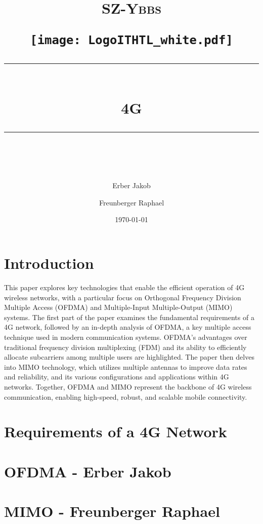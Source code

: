 \documentclass[11pt]{scrartcl} %
\title{	
	\normalfont\normalsize
	\begin{center}
		\begin{minipage}[c]{0.2\textwidth}
			\textsc{\Large SZ-Ybbs}
		\end{minipage}%
		\begin{minipage}[c]{0.1\textwidth}
			\texttt{[image: LogoITHTL\_white.pdf]}
		\end{minipage}
	\end{center}
	\vspace{10pt} %
	\rule{\linewidth}{0.5pt}\\ %
	\vspace{20pt} %
	{\huge 4G}\\ %
	\vspace{12pt} %
	\rule{\linewidth}{2pt}\\ %
	\vspace{12pt} %
}
\author{\LARGE Erber Jakob \and \LARGE Freunberger Raphael} %
\date{\normalsize\today} %
\begin{document}
\maketitle %

\tableofcontents
\clearpage

\section{Introduction}
This paper explores key technologies that enable the efficient operation of 4G wireless networks, with a particular focus on Orthogonal Frequency Division Multiple Access (OFDMA) and Multiple-Input Multiple-Output (MIMO) systems. The first part of the paper examines the fundamental requirements of a 4G network, followed by an in-depth analysis of OFDMA, a key multiple access technique used in modern communication systems. OFDMA's advantages over traditional frequency division multiplexing (FDM) and its ability to efficiently allocate subcarriers among multiple users are highlighted. The paper then delves into MIMO technology, which utilizes multiple antennas to improve data rates and reliability, and its various configurations and applications within 4G networks. Together, OFDMA and MIMO represent the backbone of 4G wireless communication, enabling high-speed, robust, and scalable mobile connectivity.

\section{Requirements of a 4G Network}


\section{OFDMA - Erber Jakob}


\section{MIMO - Freunberger Raphael}

\end{document}
